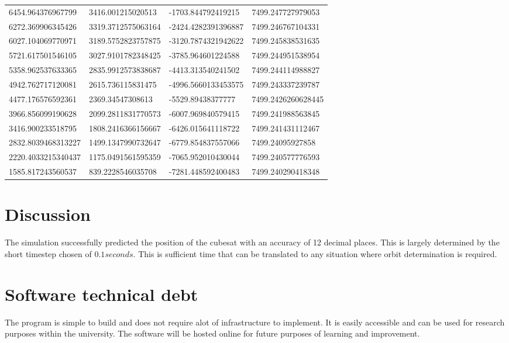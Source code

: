 \begin{tabular}{ |p{4cm}|p{4cm}|p{4cm}|p{4cm}|  }
	6454.964376967799 & 3416.001215020513 & -1703.844792419215 & 7499.247727979053\\
	6272.369906345426 & 3319.3712575063164 & -2424.4282391396887 & 7499.246767104331\\
	6027.104069770971 & 3189.5752823757875 & -3120.7874321942622 & 7499.245838531635\\
	5721.617501546105 & 3027.9101782348425 & -3785.964601224588 & 7499.244951538954\\
	5358.962537633365 & 2835.9912573838687 & -4413.313540241502 & 7499.244114988827\\
	4942.762717120081 & 2615.736115831475 & -4996.5660133453575 & 7499.243337239787\\
	4477.176576592361 & 2369.34547308613 & -5529.89438377777 & 7499.2426260628445\\
	3966.856099190628 & 2099.2811831770573 & -6007.969840579415 & 7499.241988563845\\
	3416.900233518795 & 1808.2416366156667 & -6426.015641118722 & 7499.241431112467\\
	2832.8039468313227 & 1499.1347990732647 & -6779.854837557066 & 7499.24095927858\\
	2220.4033215340437 & 1175.0491561595359 & -7065.952010430044 & 7499.240577776593\\
	1585.817243560537 & 839.2228546035708 & -7281.448592400483 & 7499.240290418348\\
	\hline
\end{tabular}
\label{tbl:kunstable}

\section{Discussion}
The simulation successfully predicted the position of the cubesat with an accuracy of 12 decimal places. This is largely determined by the short timestep chosen of \(0.1 seconds\). This is sufficient time that can be translated to any situation where orbit determination is required.

\section{Software technical debt}
The program is simple to build and does not require alot of infrastructure to implement. It is easily accessible and can be used for research purposes within the university. The software will be hosted online for future purposes of learning and improvement.




